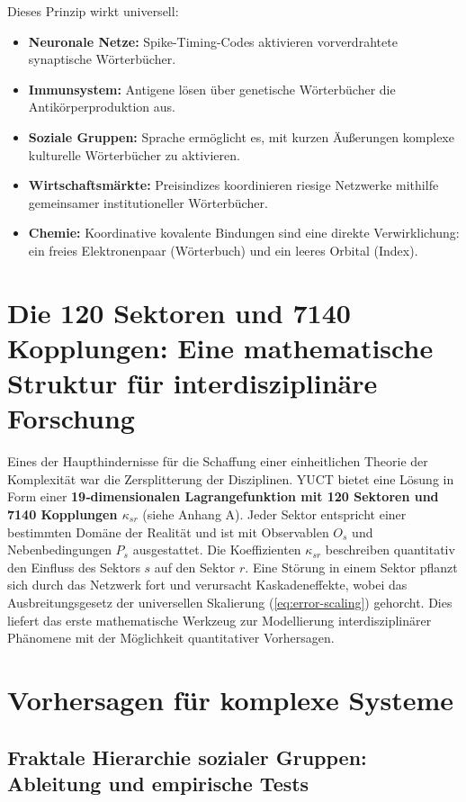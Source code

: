 \documentclass[11pt]{article}
\theoremstyle{remark}
\begin{document}
	Dieses Prinzip wirkt universell:
	\begin{itemize}
		\item \textbf{Neuronale Netze:} Spike-Timing-Codes aktivieren vorverdrahtete synaptische Wörterbücher.
		\item \textbf{Immunsystem:} Antigene lösen über genetische Wörterbücher die Antikörperproduktion aus.
		\item \textbf{Soziale Gruppen:} Sprache ermöglicht es, mit kurzen Äußerungen komplexe kulturelle Wörterbücher zu aktivieren.
		\item \textbf{Wirtschaftsmärkte:} Preisindizes koordinieren riesige Netzwerke mithilfe gemeinsamer institutioneller Wörterbücher.
		\item \textbf{Chemie:} Koordinative kovalente Bindungen sind eine direkte Verwirklichung: ein freies Elektronenpaar (Wörterbuch) und ein leeres Orbital (Index).
	\end{itemize}
	
	\section{Die 120 Sektoren und 7140 Kopplungen: Eine mathematische Struktur für interdisziplinäre Forschung}
	\label{sec:sectors}
	
	Eines der Haupthindernisse für die Schaffung einer einheitlichen Theorie der Komplexität war die Zersplitterung der Disziplinen. YUCT bietet eine Lösung in Form einer \textbf{19‑dimensionalen Lagrangefunktion mit 120 Sektoren und 7140 Kopplungen \(\kappa_{sr}\)} (siehe Anhang A). Jeder Sektor entspricht einer bestimmten Domäne der Realität und ist mit Observablen \(O_s\) und Nebenbedingungen \(P_s\) ausgestattet. Die Koeffizienten \(\kappa_{sr}\) beschreiben quantitativ den Einfluss des Sektors \(s\) auf den Sektor \(r\). Eine Störung in einem Sektor pflanzt sich durch das Netzwerk fort und verursacht Kaskadeneffekte, wobei das Ausbreitungsgesetz der universellen Skalierung (\ref{eq:error-scaling}) gehorcht. Dies liefert das erste mathematische Werkzeug zur Modellierung interdisziplinärer Phänomene mit der Möglichkeit quantitativer Vorhersagen.
	
	\section{Vorhersagen für komplexe Systeme}
	\label{sec:predictions}
	
	\subsection{Fraktale Hierarchie sozialer Gruppen: Ableitung und empirische Tests}
	\label{sec:social_scaling}
	
\end{document}
